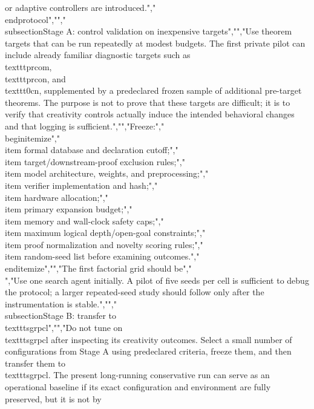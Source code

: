 {{{or adaptive controllers are introduced.","\\end{protocol}","","\\subsection{Stage A: control validation on inexpensive targets}","","Use theorem targets that can be run repeatedly at modest budgets. The first private pilot can include already familiar diagnostic targets such as \\texttt{prcom}, \\texttt{prcon}, and \\texttt{0cn}, supplemented by a predeclared frozen sample of additional pre-target theorems. The purpose is not to prove that these targets are difficult; it is to verify that creativity controls actually induce the intended behavioral changes and that logging is sufficient.","","Freeze:","\\begin{itemize}","\\item formal database and declaration cutoff;","\\item target/downstream-proof exclusion rules;","\\item model architecture, weights, and preprocessing;","\\item verifier implementation and hash;","\\item hardware allocation;","\\item primary expansion budget;","\\item memory and wall-clock safety caps;","\\item maximum logical depth/open-goal constraints;","\\item proof normalization and novelty scoring rules;","\\item random-seed list before examining outcomes.","\\end{itemize}","","The first factorial grid should be","\\[","\\text{guidance}\\in\\{\\text{off},\\text{on}\\}","\\quad\\times\\quad","c\\in\\{0,0.25,0.50,0.75,1.00\\}.","\\]","Use one search agent initially. A pilot of five seeds per cell is sufficient to debug the protocol; a larger repeated-seed study should follow only after the instrumentation is stable.","","\\subsection{Stage B: transfer to \\texttt{sgrpcl}}","","Do not tune on \\texttt{sgrpcl} after inspecting its creativity outcomes. Select a small number of configurations from Stage A using predeclared criteria, freeze them, and then transfer them to \\texttt{sgrpcl}. The present long-running conservative run can serve as an operational baseline if its exact configuration and environment are fully preserved, but it is not by }}}
